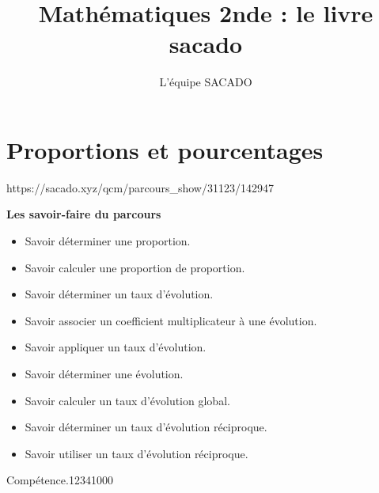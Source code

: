 



\title{Mathématiques 2nde  : le livre sacado}
\author{L'équipe SACADO}




\chapter{Proportions et pourcentages }
{https://sacado.xyz/qcm/parcours_show/31123/142947}
{
 \begin{CpsCol}
	\textbf{Les savoir-faire du parcours}
 	\begin{itemize}
 		\item Savoir déterminer une proportion.
		\item Savoir calculer une proportion de proportion.
		\item Savoir déterminer un taux d'évolution.
		\item Savoir associer un coefficient multiplicateur à une évolution.
		\item Savoir appliquer un taux d'évolution.
		\item Savoir déterminer une évolution.
		\item Savoir calculer un taux d'évolution global.
		\item Savoir déterminer un taux d'évolution réciproque.
		\item Savoir utiliser un taux d'évolution réciproque.
 	\end{itemize}
 \end{CpsCol}

\begin{His}
\end{His}

\begin{ExoDec}{Compétence.}{1234}{1}{0}{0}{0}
\end{ExoDec}
}


